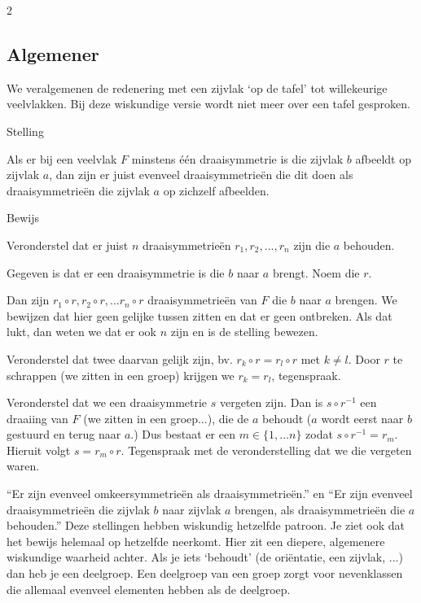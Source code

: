 \begin{multicols}{2}

\subsection{Algemener}

We veralgemenen de redenering met een zijvlak `op de tafel' tot willekeurige veelvlakken. Bij deze wiskundige versie wordt niet meer over een tafel gesproken.

\begin{kader}{Stelling}{}

    Als er bij een veelvlak $F$ minstens één draaisymmetrie is die zijvlak $b$ afbeeldt op zijvlak $a$, dan zijn er juist evenveel draaisymmetrieën die dit doen als draaisymmetrieën die zijvlak $a$ op zichzelf afbeelden.

\end{kader}

\begin{kader}{Bewijs}{}

    Veronderstel dat er juist $n$ draaisymmetrieën $r_1, r_2, ..., r_n$ zijn die $a$ behouden.
    
    Gegeven is dat er een draaisymmetrie is die $b$ naar $a$ brengt. Noem die $r$.
    
    Dan zijn $r_1\circ r, r_2\circ r, ... r_n\circ r$ draaisymmetrieën van $F$ die $b$ naar $a$ brengen. We bewijzen dat hier geen gelijke tussen zitten en dat er geen ontbreken. Als dat lukt, dan weten we dat er ook $n$ zijn en is de stelling bewezen.
    \end{kader}

\begin{kader}{}{}
    Veronderstel dat twee daarvan gelijk zijn, bv. $r_k\circ r= r_l\circ r$ met $k\ne l$. Door $r$ te schrappen (we zitten in een groep) krijgen we $r_k=r_l$, tegenspraak.
    
    Veronderstel dat we een draaisymmetrie $s$ vergeten zijn. Dan is $s\circ r^{-1}$ een draaiing van $F$ (we zitten in een groep...), die de $a$ behoudt ($a$ wordt eerst naar $b$ gestuurd en terug naar $a$.) Dus bestaat er een $m\in \{1,...n\}$ zodat $s\circ r^{-1}=r_m$. Hieruit volgt $s=r_m\circ r$. Tegenspraak met de veronderstelling dat we die vergeten waren.

\end{kader}

``Er zijn evenveel omkeersymmetrieën als draaisymmetrieën.'' en ``Er zijn evenveel draaisymmetrieën die zijvlak $b$ naar zijvlak $a$ brengen, als draaisymmetrieën die $a$ behouden.'' Deze stellingen hebben wiskundig hetzelfde patroon. Je ziet ook dat het bewijs helemaal op hetzelfde neerkomt. Hier zit een diepere, algemenere wiskundige waarheid achter. Als je iets `behoudt' (de oriëntatie, een zijvlak,  ...) dan heb je een deelgroep. Een deelgroep van een groep zorgt voor nevenklassen die allemaal evenveel elementen hebben als de deelgroep.


\end{multicols}
